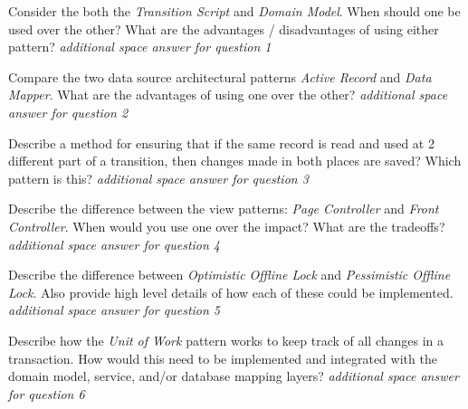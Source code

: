 \documentclass[11pt]{exam}
\begin{document}
\begin{questions}

\question[25] Consider the both the {\it Transition Script} and {\it Domain Model}.  When should one be used over the other?  What are the advantages / disadvantages of using either pattern?
\newpage
{\it additional space answer for question 1}
\newpage

\question[25] Compare the two data source architectural patterns {\it Active Record} and {\it Data Mapper}.  What are the advantages of using one over the other?
\newpage
{\it additional space answer for question 2}
\newpage

\question[25] Describe a method for ensuring that if the same record is read and used at 2 different part of a transition, then changes made in both places are saved?  Which pattern is this?
\newpage
{\it additional space answer for question 3}
\newpage



\question[25] Describe the difference between the view patterns: {\it Page Controller} and {\it Front Controller}.  When would you use one over the impact? What are the tradeoffs?
\newpage
{\it additional space answer for question 4}
\newpage

\question[25] Describe the difference between {\it Optimistic Offline Lock} and {\it Pessimistic Offline Lock}.   Also provide high level details of how each of these could be implemented.
\newpage
{\it additional space answer for question 5}
\newpage

\question[25] Describe how the {\it Unit of Work} pattern works to keep track of all changes in a transaction.  How would this need to be implemented and integrated with the domain model, service, and/or database mapping layers?
\newpage
{\it additional space answer for question 6}

\end{questions}
\end{document}
